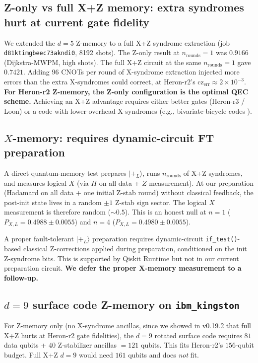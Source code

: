 \documentclass[11pt,letterpaper]{article}
\begin{document}
\subsection{Z-only vs full X+Z memory: extra syndromes hurt at current gate fidelity}\label{ssec:full_xz}

We extended the $d = 5$ Z-memory to a full X+Z syndrome extraction (job \texttt{d81ktimgbeec73akndi0}, 8192 shots). The Z-only result at $n_{\mathrm{rounds}} = 1$ was $0.9166$ (Dijkstra-MWPM, high shots). The full X+Z circuit at the same $n_{\mathrm{rounds}} = 1$ gave $0.7421$. Adding 96 CNOTs per round of X-syndrome extraction injected more errors than the extra X-syndromes could correct, at Heron-r2's $\mathrm{cz}_{\mathrm{err}} \approx 2 \times 10^{-3}$. \textbf{For Heron-r2 Z-memory, the Z-only configuration is the optimal QEC scheme.} Achieving an X+Z advantage requires either better gates (Heron-r3 / Loon) or a code with lower-overhead X-syndromes (e.g., bivariate-bicycle codes \cite{bb_paper}).

\subsection{$X$-memory: requires dynamic-circuit FT preparation}\label{ssec:x_memory}

A direct quantum-memory test prepares $|+_L\rangle$, runs $n_{\mathrm{rounds}}$ of X+Z syndromes, and measures logical $X$ (via $H$ on all data + $Z$ measurement). At our preparation (Hadamard on all data + one initial Z-stab round) without classical feedback, the post-init state lives in a random $\pm 1$ Z-stab sign sector. The logical $X$ measurement is therefore random ($\sim 0.5$). This is an honest null at $n = 1$ ($P_{X,L} = 0.4988 \pm 0.0055$) and $n = 4$ ($P_{X,L} = 0.4980 \pm 0.0055$).

A proper fault-tolerant $|+_L\rangle$ preparation requires dynamic-circuit \texttt{if\_test()}-based classical Z-corrections applied during preparation, conditioned on the init Z-syndrome bits. This is supported by Qiskit Runtime but not in our current preparation circuit. \textbf{We defer the proper X-memory measurement to a follow-up.}

\subsection{$d = 9$ surface code Z-memory on \texttt{ibm\_kingston}}\label{ssec:d9}

For Z-memory only (no X-syndrome ancillas, since we showed in v0.19.2 that full X+Z hurts at Heron-r2 gate fidelities), the $d = 9$ rotated surface code requires $81$ data qubits + $40$ Z-stabilizer ancillas $= 121$ qubits. This fits Heron-r2's $156$-qubit budget. Full X+Z $d = 9$ would need $161$ qubits and does \emph{not} fit.
\end{document}
